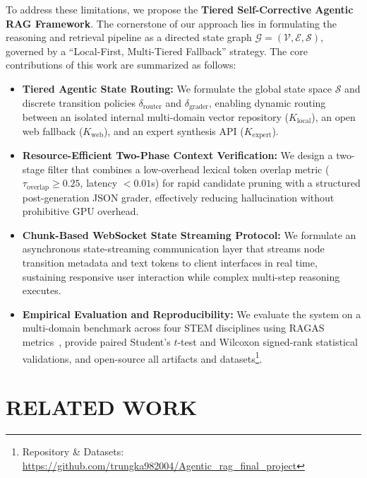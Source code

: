 \documentclass[conference]{IEEEtran}
\begin{document}
To address these limitations, we propose the \textbf{Tiered Self-Corrective Agentic RAG Framework}. The cornerstone of our approach lies in formulating the reasoning and retrieval pipeline as a directed state graph $\mathcal{G} = (\mathcal{V}, \mathcal{E}, \mathcal{S})$, governed by a ``Local-First, Multi-Tiered Fallback'' strategy. The core contributions of this work are summarized as follows:
\begin{itemize}
    \item \textbf{Tiered Agentic State Routing:} We formulate the global state space $\mathcal{S}$ and discrete transition policies $\delta_{\text{router}}$ and $\delta_{\text{grader}}$, enabling dynamic routing between an isolated internal multi-domain vector repository ($K_{\text{local}}$), an open web fallback ($K_{\text{web}}$), and an expert synthesis API ($K_{\text{expert}}$).
    \item \textbf{Resource-Efficient Two-Phase Context Verification:} We design a two-stage filter that combines a low-overhead lexical token overlap metric ($\tau_{\text{overlap}} \ge 0.25$, latency $< 0.01$s) for rapid candidate pruning with a structured post-generation JSON grader, effectively reducing hallucination without prohibitive GPU overhead.
    \item \textbf{Chunk-Based WebSocket State Streaming Protocol:} We formulate an asynchronous state-streaming communication layer that streams node transition metadata and text tokens to client interfaces in real time, sustaining responsive user interaction while complex multi-step reasoning executes.
    \item \textbf{Empirical Evaluation and Reproducibility:} We evaluate the system on a multi-domain benchmark across four STEM disciplines using RAGAS metrics~\cite{es2023ragas}, provide paired Student's $t$-test and Wilcoxon signed-rank statistical validations, and open-source all artifacts and datasets\footnote{Repository \& Datasets: \url{https://github.com/trungka982004/Agentic_rag_final_project}}.
\end{itemize}

\section{RELATED WORK}
\end{document}
